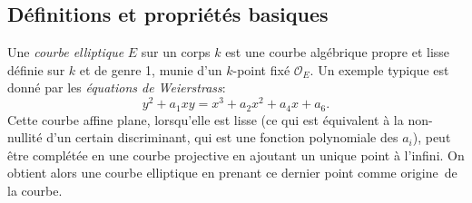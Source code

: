 \documentclass[11pt,a4paper]{article}
\renewcommand{\O}{\mathcal{O}}
\theoremstyle{definition}
\begin{document}
\subsection{Définitions et propriétés basiques}


Une \emph{courbe elliptique} $E$ sur un corps $k$ est une courbe algébrique propre et lisse définie sur $k$ et de genre 1, munie d'un $k$-point fixé $\O_E$. Un exemple typique est donné par les \emph{équations de Weierstrass}:
$$y^2 + a_1xy = x^3 + a_2x^2 + a_4 x + a_6.$$
Cette courbe affine plane, lorsqu'elle est lisse (ce qui est équivalent à la non-nullité d'un certain discriminant, qui est une fonction polynomiale des $a_i$), peut être complétée en une courbe projective en ajoutant un unique point à l'infini. On obtient alors une courbe elliptique en prenant ce dernier point comme \og origine\fg\ de la courbe.
\end{document}
